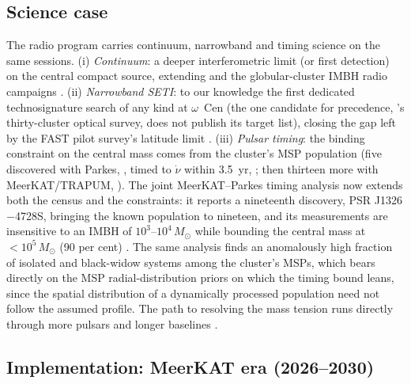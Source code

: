 \documentclass[11pt]{article}
\newcommand{\msun}{\ensuremath{M_\odot}}
\newcommand{\ocen}{\ensuremath{\omega}~Cen}
\begin{document}
\subsection{Science case}

The radio program carries continuum, narrowband and timing science on the same sessions. (i) \emph{Continuum}: a deeper interferometric limit (or first detection) on the central compact source, extending \citet{Mahida2026} and the globular-cluster IMBH radio campaigns \citep{Strader2012,Tremou2018}. (ii) \emph{Narrowband SETI}: to our knowledge the first dedicated technosignature search of any kind at \ocen{} (the one candidate for precedence, \citeauthor{Bhathal2010}'s thirty-cluster optical survey, does not publish its target list), closing the gap left by the FAST pilot survey's latitude limit \citep{Huang2026}. (iii) \emph{Pulsar timing}: the binding constraint on the central mass comes from the cluster's MSP population (five discovered with Parkes, \citealt{Dai2020}, timed to $\dot\nu$ within 3.5~yr, \citealt{Dai2023}; then thirteen more with MeerKAT/TRAPUM, \citealt{Chen2023,StappersKramer2016}). The joint MeerKAT--Parkes timing analysis now extends both the census and the constraints: it reports a nineteenth discovery, PSR J1326$-$4728S, bringing the known population to nineteen, and its measurements are insensitive to an IMBH of $10^{3}$--$10^{4}\,\msun$ while bounding the central mass at $<10^{5}\,\msun$ (90 per cent) \citep{ColomiBernadich2026}. The same analysis finds an anomalously high fraction of isolated and black-widow systems among the cluster's MSPs, which bears directly on the MSP radial-distribution priors on which the \citet{BanaresHernandez2025} timing bound leans, since the spatial distribution of a dynamically processed population need not follow the assumed profile. The path to resolving the mass tension runs directly through more pulsars and longer baselines \citep{BanaresHernandez2025,Chen2025MiniPTA}.

\subsection{Implementation: MeerKAT era (2026--2030)}
\end{document}
